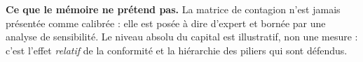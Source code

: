 \begin{attention}
\textbf{Ce que le mémoire ne prétend pas.} La matrice de contagion n'est jamais présentée comme
calibrée : elle est posée à dire d'expert et bornée par une analyse de sensibilité. Le niveau
absolu du capital est illustratif, non une mesure : c'est l'effet \emph{relatif} de la conformité
et la hiérarchie des piliers qui sont défendus.
\end{attention}
